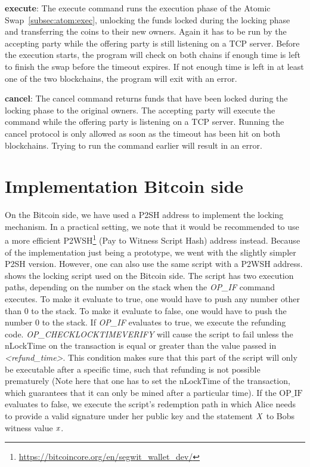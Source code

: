 \begin{asparaitem}
    \item \textbf{execute}: The execute command runs the execution phase of the Atomic Swap~\cref{subsec:atom:exec}, unlocking the funds locked during the locking phase and transferring the coins to their new owners.
    Again it has to be run by the accepting party while the offering party is still listening on a TCP server.
    Before the execution starts, the program will check on both chains if enough time is left to finish the swap before the timeout expires.
    If not enough time is left in at least one of the two blockchains, the program will exit with an error.
    \item \textbf{cancel}: The cancel command returns funds that have been locked during the locking phase to the original owners.
    The accepting party will execute the command while the offering party is listening on a TCP server.
    Running the cancel protocol is only allowed as soon as the timeout has been hit on both blockchains.
    Trying to run the command earlier will result in an error.
\end{asparaitem}

\section{Implementation Bitcoin side}\label{sec:ImplementationBtc}

On the Bitcoin side, we have used a P2SH address to implement the locking mechanism.
In a practical setting, we note that it would be recommended to use a more efficient P2WSH\footnote{\url{https://bitcoincore.org/en/segwit_wallet_dev/}} (Pay to Witness Script Hash) address instead.
Because of the implementation just being a prototype, we went with the slightly simpler P2SH version.
However, one can also use the same script with a P2WSH address.
 shows the locking script used on the Bitcoin side.
The script has two execution paths, depending on the number on the stack when the \textit{OP\_IF} command executes.
To make it evaluate to true, one would have to push any number other than 0 to the stack.
To make it evaluate to false, one would have to push the number 0 to the stack.
If \textit{OP\_IF} evaluates to true, we execute the refunding code.
\textit{OP\_CHECKLOCKTIMEVERIFY} will cause the script to fail unless the nLockTime on the transaction is equal or greater than the value passed in \textit{<refund\_time>}.
This condition makes sure that this part of the script will only be executable after a specific time, such that refunding is not possible prematurely (Note here that one has to set the nLockTime of the transaction, which guarantees that it can only be mined after a particular time).
If the $\text{OP\_IF}$ evaluates to false, we execute the script's redemption path in which Alice needs to provide a valid signature under her public key and the statement $\mathit{X}$ to Bobs witness value $\mathit{x}$.

